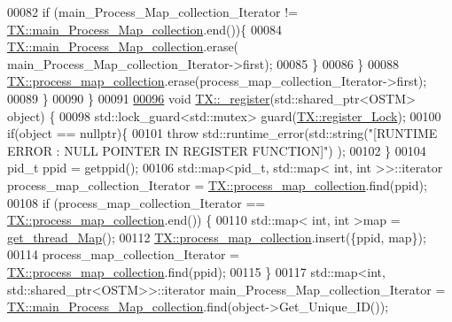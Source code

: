 \begin{DoxyCode}
00082             \textcolor{keywordflow}{if} (main\_Process\_Map\_collection\_Iterator != 
      \hyperlink{class_t_x_a1a45d726894190695314464d7cd97c29_a1a45d726894190695314464d7cd97c29}{TX::main\_Process\_Map\_collection}.end())\{
00084                 \hyperlink{class_t_x_a1a45d726894190695314464d7cd97c29_a1a45d726894190695314464d7cd97c29}{TX::main\_Process\_Map\_collection}.erase(
      main\_Process\_Map\_collection\_Iterator->first);      
00085             \}
00086         \}
00088         \hyperlink{class_t_x_a2e3cd2f52fd93cf6ef3eb3c1cb830b9f_a2e3cd2f52fd93cf6ef3eb3c1cb830b9f}{TX::process\_map\_collection}.erase(process\_map\_collection\_Iterator->first);
00089     \}
00090 \}
00091 
\hypertarget{_t_x_8cpp_source.tex_l00096}{}\hyperlink{class_t_x_abc32af2f51df97ac483e5bfe7db6ca6e_abc32af2f51df97ac483e5bfe7db6ca6e}{00096} \textcolor{keywordtype}{void} \hyperlink{class_t_x_abc32af2f51df97ac483e5bfe7db6ca6e_abc32af2f51df97ac483e5bfe7db6ca6e}{TX::\_register}(std::shared\_ptr<OSTM> \textcolor{keywordtype}{object}) \{
00098     std::lock\_guard<std::mutex> guard(\hyperlink{class_t_x_aa688a8c96fa3cdf8cd92e267463536dc_aa688a8c96fa3cdf8cd92e267463536dc}{TX::register\_Lock});
00100     \textcolor{keywordflow}{if}(\textcolor{keywordtype}{object} == \textcolor{keyword}{nullptr})\{
00101         \textcolor{keywordflow}{throw} std::runtime\_error(std::string(\textcolor{stringliteral}{"[RUNTIME ERROR : NULL POINTER IN REGISTER FUNCTION]"}) );
00102     \}
00104     pid\_t ppid = getppid();
00106     std::map<pid\_t, std::map< int, int >>::iterator process\_map\_collection\_Iterator = 
      \hyperlink{class_t_x_a2e3cd2f52fd93cf6ef3eb3c1cb830b9f_a2e3cd2f52fd93cf6ef3eb3c1cb830b9f}{TX::process\_map\_collection}.find(ppid);
00108     \textcolor{keywordflow}{if} (process\_map\_collection\_Iterator == \hyperlink{class_t_x_a2e3cd2f52fd93cf6ef3eb3c1cb830b9f_a2e3cd2f52fd93cf6ef3eb3c1cb830b9f}{TX::process\_map\_collection}.end()) \{
00110         std::map< int, int >map =  \hyperlink{class_t_x_a3f5671423cb7b9f9c98f8a25f2a4b545_a3f5671423cb7b9f9c98f8a25f2a4b545}{get\_thread\_Map}();
00112         \hyperlink{class_t_x_a2e3cd2f52fd93cf6ef3eb3c1cb830b9f_a2e3cd2f52fd93cf6ef3eb3c1cb830b9f}{TX::process\_map\_collection}.insert(\{ppid, map\});
00114         process\_map\_collection\_Iterator = \hyperlink{class_t_x_a2e3cd2f52fd93cf6ef3eb3c1cb830b9f_a2e3cd2f52fd93cf6ef3eb3c1cb830b9f}{TX::process\_map\_collection}.find(ppid);
00115     \}
00117     std::map<int, std::shared\_ptr<OSTM>>::iterator main\_Process\_Map\_collection\_Iterator = 
      \hyperlink{class_t_x_a1a45d726894190695314464d7cd97c29_a1a45d726894190695314464d7cd97c29}{TX::main\_Process\_Map\_collection}.find(object->Get\_Unique\_ID());

\end{DoxyCode}
